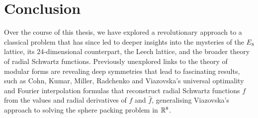 \chapter{Conclusion}
\label{Ch6:Chapter}
\thispagestyle{empty}

Over the course of this thesis, we have explored a revolutionary approach to a classical problem that has since led to deeper insights into the mysteries of the $E_8$ lattice, its $24$-dimensional counterpart, the Leech lattice, and the broader theory of radial Schwartz functions. Previously unexplored links to the theory of modular forms are revealing deep symmetries that lead to fascinating results, such as Cohn, Kumar, Miller, Radchenko and Viazovska's universal optimality and Fourier interpolation formulas \cite{UniversalOptimality} that reconstruct radial Schwartz functions $f$ from the values and radial derivatives of $f$ and $\hat{f}$, generalising Viazovska's approach to solving the sphere packing problem in $\mathbb{R}^8$. 



